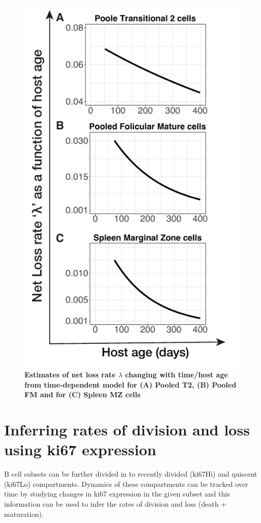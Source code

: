 \documentclass[11pt]{article}
\begin{document}
\begin{figure}[h!]
	\centerline{\includegraphics[scale = 1.1] {lambda_plots.pdf}}
	\caption{\small \textbf{Estimates of net loss rate $\lambda$ changing with time/host age from time-dependent model for (A) Pooled T2, (B) Pooled FM and for (C) Spleen MZ cells }}
	\label{fig:lambda}
\end{figure}


\section*{Inferring rates of division and loss using ki67 expression}
B cell subsets can be further divided in to recently divided (ki67Hi) and quiscent (ki67Lo) compartments. Dynamics of these compartments can  be tracked over time by studying changes in ki67 expression in the given subset and this information can be used to infer the rates of division and loss (death + maturation).
\end{document}
